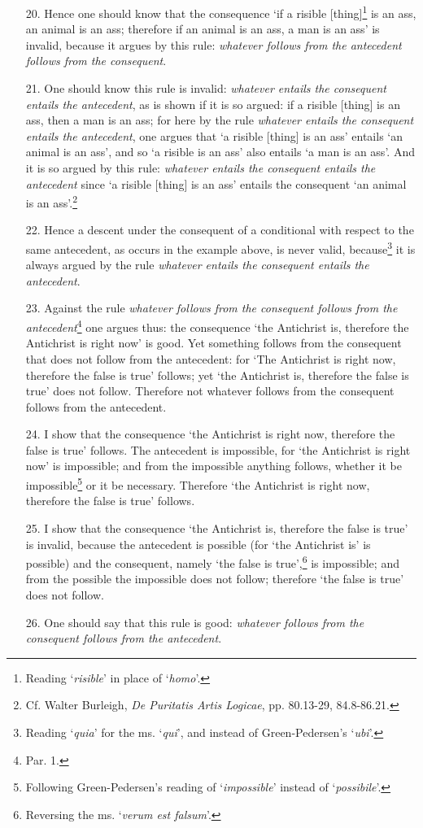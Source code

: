 \documentclass[]{article}
\begin{document}
\begin{enumerate}
\item[20.] Hence one should know that the consequence `if a risible [thing]\footnote{Reading `\textit{risible}' in place of `\textit{homo}'.} is an ass, an animal is an ass; therefore if an animal is an ass, a man is an ass' is invalid, because it argues by this rule: \textit{whatever follows from the antecedent follows from the consequent}.
\item[21.] One should know this rule is invalid: \textit{whatever entails the consequent entails the antecedent}, as is shown if it is so argued: if a risible [thing] is an ass, then a man is an ass; for here by the rule \textit{whatever entails the consequent entails the antecedent}, one argues that `a risible [thing] is an ass' entails `an animal is an ass', and so `a risible is an ass' also entails `a man is an ass'. And it is so argued by this rule: \textit{whatever entails the consequent entails the antecedent} since `a risible [thing] is an ass' entails the consequent `an animal is an ass'.\footnote{Cf. Walter Burleigh, \textit{De Puritatis Artis Logicae}, pp. 80.13-29, 84.8-86.21.}
\item[22.] Hence a descent under the consequent of a conditional with respect to the same antecedent, as occurs in the example above, is never valid, because\footnote{Reading `\textit{quia}' for the ms. `\textit{qui}', and instead of Green-Pedersen's `\textit{ubi}'.} it is always argued by the rule \textit{whatever entails the consequent entails the antecedent}.
\item[23.] Against the rule \textit{whatever follows from the consequent follows from the antecedent}\footnote{Par. 1.} one argues thus: the consequence `the Antichrist is, therefore the Antichrist is right now' is good. Yet something follows from the consequent that does not follow from the antecedent: for `The Antichrist is right now, therefore the false is true' follows; yet `the Antichrist is, therefore the false is true' does not follow. Therefore not whatever follows from the consequent follows from the antecedent.
\item[24.] I show that the consequence `the Antichrist is right now, therefore the false is true' follows. The antecedent is impossible, for `the Antichrist is right now' is impossible; and from the impossible anything follows, whether it be impossible\footnote{Following Green-Pedersen's reading of `\textit{impossible}' instead of `\textit{possibile}'.} or it be necessary. Therefore `the Antichrist is right now, therefore the false is true' follows.
\item[25.] I show that the consequence `the Antichrist is, therefore the false is true' is invalid, because the antecedent is possible (for `the Antichrist is' is possible) and the consequent, namely `the false is true',\footnote{Reversing the ms. `\textit{verum est falsum}'.} is impossible; and from the possible the impossible does not follow; therefore `the false is true' does not follow.
\item[26.] One should say that this rule is good: \textit{whatever follows from the consequent follows from the antecedent}. 


\end{enumerate}
\end{document}
